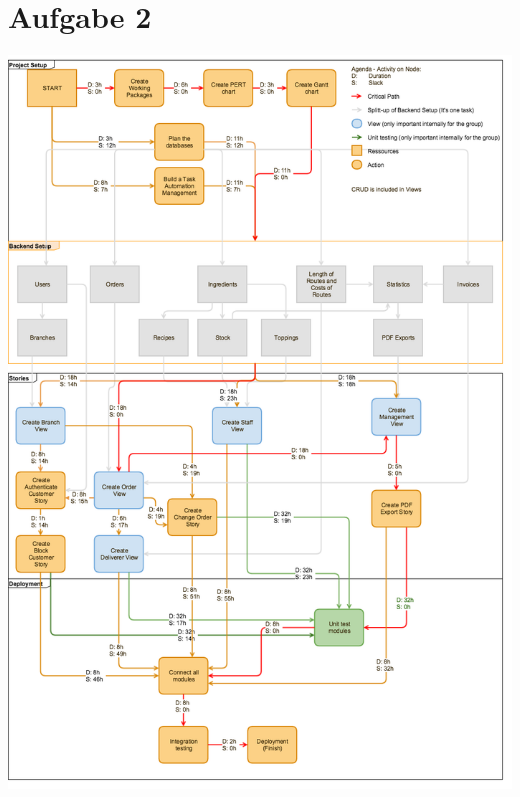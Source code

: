 \documentclass[a4paper]{report}
\begin{document}
\section*{Aufgabe 2}
        \includegraphics[width=14cm]{./diagramm.png}  
        
\end{document}
